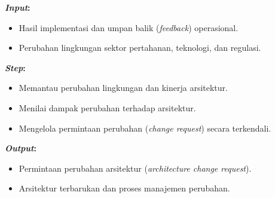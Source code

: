 \textbf{\textit{Input}:}
\begin{itemize}
  \item Hasil implementasi dan umpan balik (\textit{feedback}) operasional.
  \item Perubahan lingkungan sektor pertahanan, teknologi, dan regulasi.
\end{itemize}
\textbf{\textit{Step}:}
\begin{itemize}
  \item Memantau perubahan lingkungan dan kinerja arsitektur.
  \item Menilai dampak perubahan terhadap arsitektur.
  \item Mengelola permintaan perubahan (\textit{change request}) secara terkendali.
\end{itemize}
\textbf{\textit{Output}:}
\begin{itemize}
  \item Permintaan perubahan arsitektur (\textit{architecture change request}).
  \item Arsitektur terbarukan dan proses manajemen perubahan.
\end{itemize}